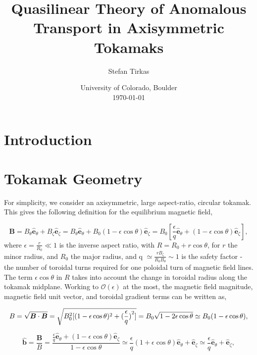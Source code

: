 \documentclass[12pt]{article}
\begin{document}
\title{Quasilinear Theory of Anomalous Transport in Axisymmetric Tokamaks}
\author{Stefan Tirkas}


\date{University of Colorado, Boulder\\[2ex]%
      \today}

\maketitle


\section{Introduction}


\section{Tokamak Geometry}
   \quad For simplicity, we consider an axisymmetric, large aspect-ratio, circular tokamak. This gives
the following definition for the equilibrium magnetic field,

   \begin{equation}
      \bm{B} = B_\theta\bm{\hat{e}}_\theta + B_\zeta\bm{\hat{e}}_\zeta =
               B_\theta\bm{\hat{e}}_\theta + B_0(1-\epsilon\cos\theta)\bm{\hat{e}}_\zeta =
               B_0[\frac{\epsilon}{q}\bm{\hat{e}}_\theta + (1-\epsilon\cos\theta)\bm{\hat{e}}_\zeta],
   \end{equation}
where $\epsilon=\frac{r}{R_0} \ll 1$ is the inverse aspect ratio, with $R=R_0+r\cos\theta$, for $r$ the minor radius,
and $R_0$ the major radius, and q $\simeq\frac{rB_\zeta}{R_0B_\theta}\sim1$ is the safety factor - the number of
toroidal turns required for one poloidal turn of magnetic field lines. The term $\epsilon\cos\theta$ in $R$ takes into
account the change in toroidal radius along the tokamak midplane. Working to $\mathcal{O}(\epsilon)$ at the most, the
magnetic field magnitude, magnetic field unit vector, and toroidal gradient terms can be written as,
   
   \begin{equation}
      B = \sqrt{\bm{B}\cdot\bm{B}} = \sqrt{B_0^2[(1-\epsilon\cos\theta)^2 + (\frac{\epsilon}{q})\strut^2]} =
          B_0\sqrt{1-2\epsilon\cos\theta} \simeq B_0(1-\epsilon\cos\theta),
   \end{equation}

   \begin{equation}
      \bm{\hat{b}} = \frac{\bm{B}}{B} = \frac{\frac{\epsilon}{q}\bm{\hat{e}}_\theta + (1-\epsilon\cos\theta)\bm{\hat{e}}_\zeta}
                     {1-\epsilon\cos\theta} \simeq \frac{\epsilon}{q}(1+\epsilon\cos\theta)\bm{\hat{e}}_\theta + 
                     \bm{\hat{e}}_\zeta \simeq \frac{\epsilon}{q}\bm{\hat{e}}_\theta + \bm{\hat{e}}_\zeta,
   \end{equation}
\end{document}
